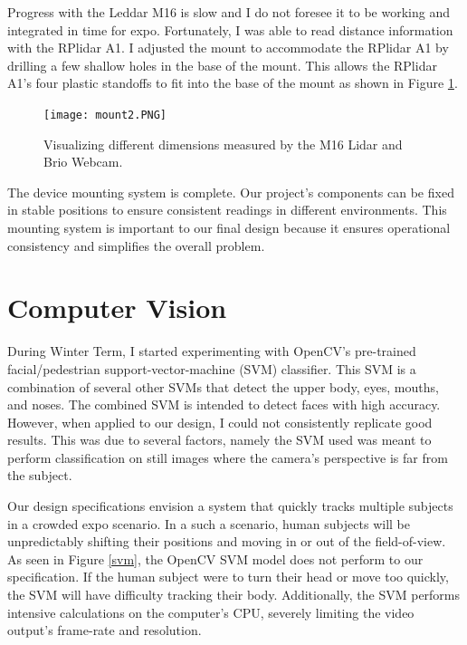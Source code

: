 \documentclass[onecolumn, draftclsnofoot,10pt, compsoc]{IEEEtran}
\makeatletter
\newcommand\captionof[1]{\def\@captype{#1}\caption}
\makeatother
\begin{document}
\begin{singlespace}
		Progress with the Leddar M16 is slow and I do not foresee it to be working and integrated in time for expo.
		Fortunately, I was able to read distance information with the RPlidar A1.
		I adjusted the mount to accommodate the RPlidar A1 by drilling a few shallow holes in the base of the mount.
		This allows the RPlidar A1's four plastic standoffs to fit into the base of the mount as shown in Figure \ref{mount2}.

		\begin{figure}[H]
			\texttt{[image: mount2.PNG]}
			\captionof{figure}{Visualizing different dimensions measured by the M16 Lidar and Brio Webcam.}
			\label{mount2}
		\end{figure}

		The device mounting system is complete. 
		Our project's components can be fixed in stable positions to ensure consistent readings in different environments.
		This mounting system is important to our final design because it ensures operational consistency and simplifies the overall problem. 


		\section{Computer Vision}
			During Winter Term, I started experimenting with OpenCV's pre-trained facial/pedestrian support-vector-machine (SVM) classifier.
			This SVM is a combination of several other SVMs that detect the upper body, eyes, mouths, and noses.
			The combined SVM is intended to detect faces with high accuracy.
			However, when applied to our design, I could not consistently replicate good results.
			This was due to several factors, namely the SVM used was meant to perform classification on still images where the camera's perspective is far from the subject.
			

			Our design specifications envision a system that quickly tracks multiple subjects in a crowded expo scenario.
			In a such a scenario, human subjects will be unpredictably shifting their positions and moving in or out of the field-of-view.
			As seen in Figure \ref{svm}, the OpenCV SVM model does not perform to our specification.
			If the human subject were to turn their head or move too quickly, the SVM will have difficulty tracking their body.
			Additionally, the SVM performs intensive calculations on the computer's CPU, severely limiting the video output's frame-rate and resolution.
			

\end{singlespace}
\end{document}
